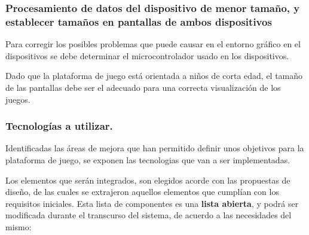 \subsubsection{Procesamiento de datos del dispositivo de menor tamaño, y establecer tamaños en pantallas de ambos dispositivos }

Para corregir los posibles problemas que puede causar en el entorno gráfico en el dispositivos se debe determinar el microcontrolador usado en los dispositivos.

Dado que la plataforma de juego está orientada a niños de corta edad, el tamaño de las pantallas debe ser el adecuado para una correcta visualización de los juegos.


\subsubsection{Tecnologías a utilizar.}

Identificadas las áreas de mejora que han permitido definir unos objetivos para la plataforma de juego, se exponen las tecnologias que van a ser implementadas.\

Los elementos que serán integrados, son elegidos acorde con las propuestas de diseño, de las cuales se extrajeron aquellos elementos que cumplían con los requisitos iniciales. Esta lista de componentes es una \textbf{lista abierta}, y podrá ser modificada durante el transcurso del sistema, de acuerdo a las necesidades del mismo:

